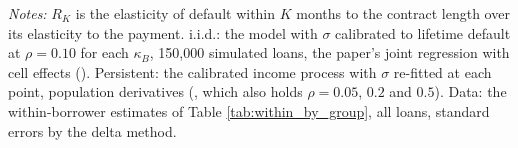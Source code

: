 \begin{table}[!ht]
\centering
\caption{The term-to-payment ratios $R_{12}$, $R_{24}$ and $R_{36}$ by discount rate and balance penalty, i.i.d.\ and persistent income, with the data's within-borrower pair}
\label{tab:persistent_windows}
\scriptsize
\resizebox{0.9\textwidth}{!}{}
\vspace{0.5em}
\begin{minipage}{0.95\textwidth}
\noindent \small \textit{Notes:} $R_K$ is the elasticity of default within $K$ months to the contract length over its elasticity to the payment. i.i.d.: the model with $\sigma$ calibrated to lifetime default at $\rho = 0.10$ for each $\kappa_B$, 150,000 simulated loans, the paper's joint regression with cell effects (). Persistent: the calibrated income process with $\sigma$ re-fitted at each point, population derivatives (, which also holds $\rho = 0.05$, $0.2$ and $0.5$). Data: the within-borrower estimates of Table \ref{tab:within_by_group}, all loans, standard errors by the delta method.
\end{minipage}
\end{table}

